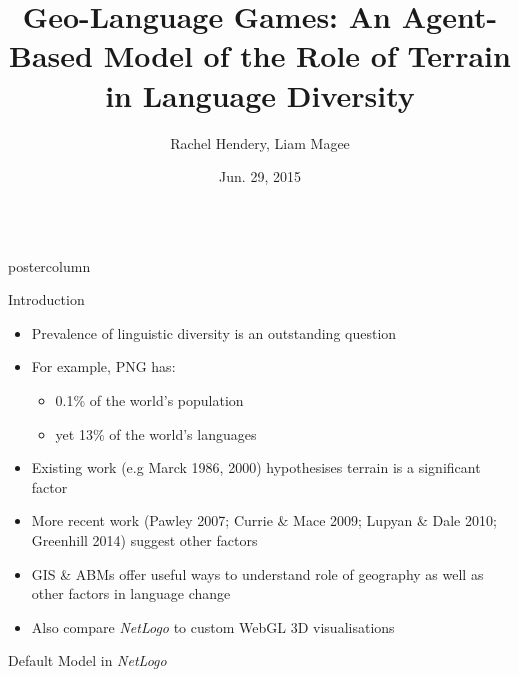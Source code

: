 \documentclass[final,hyperref={pdfpagelabels=false}]{beamer}
\title{\huge Geo-Language Games: An Agent-Based Model of the Role of Terrain in Language Diversity}
\author{Rachel Hendery, Liam Magee}
\institute[University of Western Sydney]{Digital Humanities Research Group, University of Western Sydney, Parramatta, Australia}
\date[Jun. 29, 2015]{Jun. 29, 2015}
\newlength{\columnheight}
\begin{document}
\begin{frame}
  \begin{columns}
    \begin{column}{.33\textwidth}
      \begin{beamercolorbox}[center,wd=\textwidth]{postercolumn}
        \begin{minipage}[T]{.95\textwidth}  %
          \parbox[t][\columnheight]{\textwidth}{ %
            \begin{block}{Introduction}
              \begin{itemize}
              \item Prevalence of linguistic diversity is an outstanding question
              \item For example, PNG has:
                \begin{itemize}
                \item 0.1\% of the world's population
                \item yet 13\% of the world's languages
                \end{itemize}
              \item Existing work (e.g Marck 1986, 2000) hypothesises terrain is a significant factor
              \item More recent work (Pawley 2007; Currie \& Mace 2009; Lupyan \& Dale 2010; Greenhill 2014) suggest other factors
              \item GIS \& ABMs offer useful ways to understand role of geography as well as other factors in language change
              \item Also compare \textit{NetLogo} to custom WebGL 3D visualisations
              \end{itemize}
            \end{block}
            \vfill
            \begin{block}{Default Model in \textit{NetLogo}}
              \begin{figure}
                \centering

\end{figure}
\end{block}}
\end{minipage}
\end{beamercolorbox}
\end{column}
\end{columns}
\end{frame}
\end{document}
